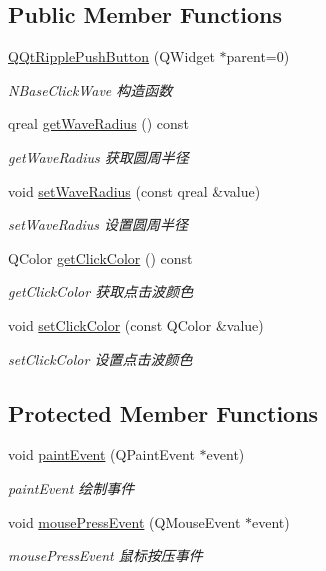 \subsection*{Public Member Functions}
\begin{DoxyCompactItemize}
\item 
\mbox{\hyperlink{class_q_qt_ripple_push_button_a972f5549b932b06df601f157bbd73baa}{Q\+Qt\+Ripple\+Push\+Button}} (Q\+Widget $\ast$parent=0)
\begin{DoxyCompactList}\small\item\em N\+Base\+Click\+Wave 构造函数 \end{DoxyCompactList}\item 
qreal \mbox{\hyperlink{class_q_qt_ripple_push_button_a621dfbd46b4f56e92c12b36e5efa76fe}{get\+Wave\+Radius}} () const
\begin{DoxyCompactList}\small\item\em get\+Wave\+Radius 获取圆周半径 \end{DoxyCompactList}\item 
void \mbox{\hyperlink{class_q_qt_ripple_push_button_a5b31e33ace99d41f1cd8f291c80c0a09}{set\+Wave\+Radius}} (const qreal \&value)
\begin{DoxyCompactList}\small\item\em set\+Wave\+Radius 设置圆周半径 \end{DoxyCompactList}\item 
Q\+Color \mbox{\hyperlink{class_q_qt_ripple_push_button_a47fd23c309cbf59cd3819776ae6c1bd0}{get\+Click\+Color}} () const
\begin{DoxyCompactList}\small\item\em get\+Click\+Color 获取点击波颜色 \end{DoxyCompactList}\item 
void \mbox{\hyperlink{class_q_qt_ripple_push_button_a62b63f01808a5b1c9ad1e83384ec6ecd}{set\+Click\+Color}} (const Q\+Color \&value)
\begin{DoxyCompactList}\small\item\em set\+Click\+Color 设置点击波颜色 \end{DoxyCompactList}\end{DoxyCompactItemize}
\subsection*{Protected Member Functions}
\begin{DoxyCompactItemize}
\item 
void \mbox{\hyperlink{class_q_qt_ripple_push_button_a8dcd120a1118df653652a804d73bc9ce}{paint\+Event}} (Q\+Paint\+Event $\ast$event)
\begin{DoxyCompactList}\small\item\em paint\+Event 绘制事件 \end{DoxyCompactList}\item 
void \mbox{\hyperlink{class_q_qt_ripple_push_button_a69b64edc08c2c1b40b92046c055972c8}{mouse\+Press\+Event}} (Q\+Mouse\+Event $\ast$event)
\begin{DoxyCompactList}\small\item\em mouse\+Press\+Event 鼠标按压事件 \end{DoxyCompactList}\end{DoxyCompactItemize}
